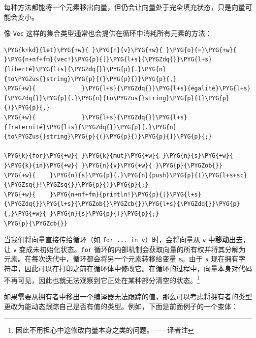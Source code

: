 每种方法都能将一个元素移出向量，但仍会让向量处于完全填充状态，只是向量可能会变小。

像 \texttt{Vec} 这样的集合类型通常也会提供在循环中消耗所有元素的方法：

\begin{Verbatim}[commandchars=\\\{\},breaklines=true,breakanywhere=true,fontsize=\codefont,xleftmargin=17bp]
\PYG{k+kd}{let}\PYG{+w}{ }\PYG{n}{v}\PYG{+w}{ }\PYG{o}{=}\PYG{+w}{ }\PYG{n+nf+fm}{vec!}\PYG{p}{[}\PYG{l+s}{\PYGZdq{}}\PYG{l+s}{liberté}\PYG{l+s}{\PYGZdq{}}\PYG{p}{.}\PYG{n}{to\PYGZus{}string}\PYG{p}{(}\PYG{p}{)}\PYG{p}{,}
\PYG{+w}{             }\PYG{l+s}{\PYGZdq{}}\PYG{l+s}{égalité}\PYG{l+s}{\PYGZdq{}}\PYG{p}{.}\PYG{n}{to\PYGZus{}string}\PYG{p}{(}\PYG{p}{)}\PYG{p}{,}
\PYG{+w}{             }\PYG{l+s}{\PYGZdq{}}\PYG{l+s}{fraternité}\PYG{l+s}{\PYGZdq{}}\PYG{p}{.}\PYG{n}{to\PYGZus{}string}\PYG{p}{(}\PYG{p}{)}\PYG{p}{]}\PYG{p}{;}

\PYG{k}{for}\PYG{+w}{ }\PYG{k}{mut}\PYG{+w}{ }\PYG{n}{s}\PYG{+w}{ }\PYG{k}{in}\PYG{+w}{ }\PYG{n}{v}\PYG{+w}{ }\PYG{p}{\PYGZob{}}
\PYG{+w}{    }\PYG{n}{s}\PYG{p}{.}\PYG{n}{push}\PYG{p}{(}\PYG{l+s+sc}{\PYGZsq{}!\PYGZsq{}}\PYG{p}{)}\PYG{p}{;}
\PYG{+w}{    }\PYG{n+nf+fm}{println!}\PYG{p}{(}\PYG{l+s}{\PYGZdq{}}\PYG{l+s}{\PYGZob{}\PYGZcb{}}\PYG{l+s}{\PYGZdq{}}\PYG{p}{,}\PYG{+w}{ }\PYG{n}{s}\PYG{p}{)}\PYG{p}{;}
\PYG{p}{\PYGZcb{}}
\end{Verbatim}

当我们将向量直接传给循环（如 \texttt{for ... in v}）时，会将向量从 \texttt{v} 中\textbf{移动}出去，让 \texttt{v} 变成未初始化状态。\texttt{for} 循环的内部机制会获取向量的所有权并将其分解为元素。在每次迭代中，循环都会将另一个元素转移给变量 \texttt{s}。由于 \texttt{s} 现在拥有字符串，因此可以在打印之前在循环体中修改它。在循环的过程中，向量本身对代码不再可见，因此也就无法观察到它正处在某种部分清空的状态。\footnote{因此不用担心中途修改向量本身之类的问题。——译者注}

如果需要从拥有者中移出一个编译器无法跟踪的值，那么可以考虑将拥有者的类型更改为能动态跟踪自己是否有值的类型。例如，下面是前面例子的一个变体：

